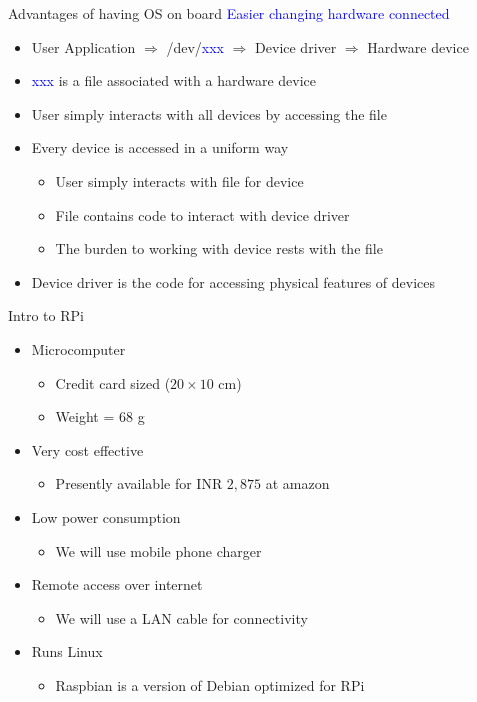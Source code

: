 \begin{frame}{Advantages of having OS on board}
	\textcolor{blue}{Easier changing hardware connected}
	\begin{itemize}
	\item User Application $\Rightarrow$ /dev/\textcolor{blue}{xxx} $\Rightarrow$ Device driver $\Rightarrow$ Hardware device
	\item \textcolor{blue}{xxx} is a file associated with a hardware device
	\item User simply interacts with all devices by accessing the file
	\item Every device is accessed in a uniform way
	\begin{itemize}
		\item User simply interacts with file for device
		\item File contains code to interact with device driver
		\item The burden to working with device rests with the file
	\end{itemize}
	\item Device driver is the code for accessing physical features of devices
\end{itemize}
\end{frame}

\begin{frame}{Intro to RPi}
	\begin{itemize}
		\item Microcomputer
		\begin{itemize}
			\item Credit card sized ($20 \times 10$ cm)
			\item Weight = $68$ g
		\end{itemize}
		\item Very cost effective
		\begin{itemize}
			\item Presently available for INR $2,875$ at amazon 
		\end{itemize}
		\item Low power consumption 
		\begin{itemize}
			\item We will use mobile phone charger
		\end{itemize}
		\item Remote access over internet
		\begin{itemize}
			\item We will use a LAN cable for connectivity
		\end{itemize}
		\item Runs Linux
		\begin{itemize}
			\item Raspbian is a version of Debian optimized for RPi
		\end{itemize}
	\end{itemize}
\end{frame}

